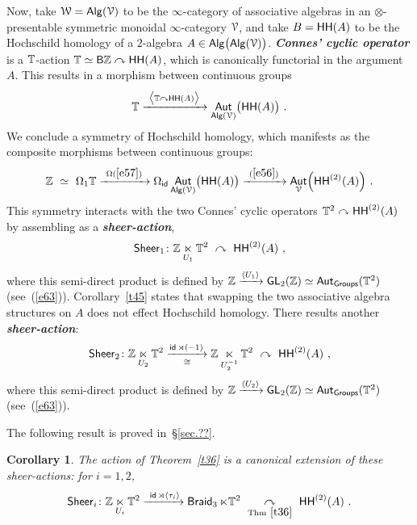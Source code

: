 \documentclass{amsart}
\newtheorem{cor}[theorem]{Corollary}
\theoremstyle{definition}
\theoremstyle{remark}
\DeclareMathOperator{\Alg}{\sf Alg}
\DeclareMathOperator{\Aut}{\sf Aut}
\newcommand{\bit}[1]{\textbf{\textit{#1}}}
\newcommand{\racts}{\curvearrowleft}
\newcommand{\lacts}{\curvearrowright}
\def\ot{\otimes}
\newcommand{\lag}{\langle}
\newcommand{\rag}{\rangle}
\newcommand{\xra}{\xrightarrow}
\newcommand{\xla}{\xleftarrow}
\DeclareMathOperator{\Braid}{{\sf Braid}_3}
\DeclareMathOperator{\GL}{\sf GL}
\DeclareMathOperator{\id}{\sf id}
\DeclareMathOperator{\sHH}{\sf HH}
\DeclareMathOperator{\HHt}{{\sf HH}^{(2)}}
\begin{document}
Now, take $\cW = \Alg(\cV)$ to be the $\infty$-category of associative algebras in an $\ot$-presentable symmetric monoidal $\infty$-category $\mathcal V$, and take $B = \sHH(A)$ to be the Hochschild homology of a $2$-algebra $A\in \Alg\bigl( \Alg(\cV) \bigr)$. 
\bit{Connes' cyclic operator} is a $\mathbb T$-action $\TT\simeq \sB \ZZ \lacts \sHH(A)$, which is canonically functorial in the argument $A$.  
This results in a morphism between continuous groups
\begin{equation}
\label{e57}
\TT
\xra{~\bigl \lag \TT \lacts \sHH(A) \bigr \rag~}
\Aut_{\Alg(\cV)}\bigl( \sHH(A) \bigr)
~.
\end{equation}
We conclude a symmetry of Hochschild homology, which manifests as the composite morphisms between continuous groups:
\[
\ZZ
~\simeq~
\Omega_1 \TT
\xra{~\Omega (\ref{e57}) ~}
\Omega_{\id} \Aut_{\Alg(\cV)}\bigl( \sHH(A) \bigr)
\xra{~(\ref{e56})~}
\Aut_{\cV}\Bigl( \HHt(A) \Bigr)
~.
\]
This symmetry interacts with the two Connes' cyclic operators $\TT^2 \lacts \HHt(A)$ by assembling as a \bit{sheer-action},
\begin{equation}
\label{e60}
{\sf Sheer}_1
\colon
\ZZ
\underset{U_1}\ltimes
\TT^2
~\lacts~
\HHt(A) 
~,
\end{equation}
where this semi-direct product is defined by $\ZZ\xra{\lag  U_1 \rag} \GL_2(\ZZ)\simeq \Aut_{\sf Groups}(\TT^2)$ (see~(\ref{e63})).
Corollary~\ref{t45} states that swapping the two associative algebra structures on $A$ does not effect Hochschild homology.
There results another \bit{sheer-action}:
\begin{equation}
\label{e71}
{\sf Sheer}_2
\colon
\ZZ 
\underset{U_2}\ltimes
\TT^2
\underset{\cong}{\xra{\id \rtimes (-1)}}
\ZZ
\underset{U_2^{-1}}\ltimes
\TT^2
~\lacts~
\HHt(A) 
~,
\end{equation}
where this semi-direct product is defined by $\ZZ\xra{\lag  U_2 \rag} \GL_2(\ZZ)\simeq \Aut_{\sf Groups}(\TT^2)$ (see~(\ref{e63})).


The following result is proved in~\S\ref{sec.??}.
\begin{cor}
\label{t55}
The action of Theorem~\ref{t36} is a canonical extension of these sheer-actions:
for $i=1,2$, 
\[
{\sf Sheer}_i
\colon
\ZZ
\underset{ U_i }\ltimes \TT^2 
\xra{~\id \rtimes \lag \tau_i \rag}
\Braid \ltimes \TT^2 
~\underset{\rm Thm~\ref{t36}}\lacts~
\HHt(A)
~.
\]

\end{cor}
\end{document}
